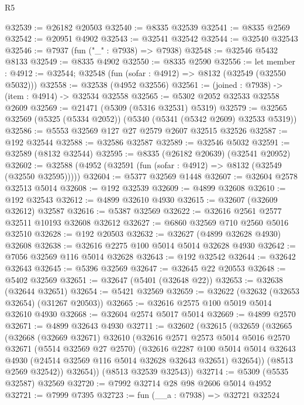 \begin{lexlean}{R5}
\begin{coremodule}
@32539 := @26182 @20503
@32540 := @8335 @32539
@32541 := @8335 @2569
@32542 := @20951 @4902
@32543 := @32541 @32542
@32544 := @32540 @32543
@32546 := @7937 (fun ("_" : @7938) => @7938)
@32548 := @32546 @5432 @8133
@32549 := @8335 @4902
@32550 := @8335 @2590
@32556 := let member : @4912 := @32544;
  @32548 (fun (sofar : @4912) => @8132 (@32549 (@32550 @5032)))
@32558 := @32538 (@4952 @32556)
@32561 := (joined : @7938) -> (item : @4914) -> @32534 @32558
@32565 := @5302 @2052 @32533 @32558 @2609
@32569 := @21471 (@5309 (@5316 @32531) @5319)
@32579 := @32565 @32569 (@5325 (@5334 @2052)) (@5340 (@5341 (@5342 @2609) @32533 @5319))
@32586 := @5553 @32569 @127 @27 @2579 @2607 @32515 @32526
@32587 := @192 @32544
@32588 := @32586 @32587
@32589 := @32546 @5032
@32591 := @32589 (@8132 @32544)
@32595 := @8335 (@26182 @20639) (@32541 @20952)
@32602 := @32588 (@4952 (@32591 (fun (sofar : @4912) => @8132 (@32549 (@32550 @32595)))))
@32604 := @5377 @32569 @1448
@32607 := @32604 @2578 @32513 @5014
@32608 := @192 @32539
@32609 := @4899 @32608
@32610 := @192 @32543
@32612 := @4899 @32610 @4930
@32615 := @32607 (@32609 @32612) @32587
@32616 := @5387 @32569
@32622 := @32616 @2561 @2577 @32511 @10193 @32608 @32612
@32627 := @6860 @32569 @710 @2560 @5016 @32510
@32628 := @192 @20503
@32632 := @32627 (@4899 @32628 @4930) @32608
@32638 := @32616 @2275 @100 @5014 @5014 @32628 @4930
@32642 := @7056 @32569 @116 @5014 @32628
@32643 := @192 @32542
@32644 := @32642 @32643
@32645 := @5396 @32569
@32647 := @32645 @22 @20553
@32648 := @5402 @32569
@32651 := @32647 (@5401 (@32648 @22))
@32653 := @32638 (@32644 @32651)
@32654 := @5421 @32569
@32659 := @32622 (@32632 (@32653 @32654) (@31267 @20503))
@32665 := @32616 @2575 @100 @5019 @5014 @32610 @4930
@32668 := @32604 @2574 @5017 @5014
@32669 := @4899 @2570
@32671 := @4899 @32643 @4930
@32711 := @32602
    (@32615
      (@32659
        (@32665
          (@32668
            (@32669 @32671)
            @32610
            (@32616
              @2571
              @2573
              @5014
              @5016
              @2570
              @32671
              (@5514 @32569 @27 @2570)
              (@32616
                @2287
                @100
                @5014
                @5014
                @32643
                @4930
                (@24514 @32569 @116 @5014 @32628 @32643 @32651)
                @32654))
            (@8513 @2569 @32542))
          @32654))
      (@8513 @32539 @32543))
@32714 := @5309 (@5535 @32587) @32569
@32720 := @7992 @32714 @28 @98 @2606 @5014 @4952
@32721 := @7999 @7395
@32723 := fun (__a : @7938) => @32721 @32524

\end{coremodule}
\end{lexlean}
